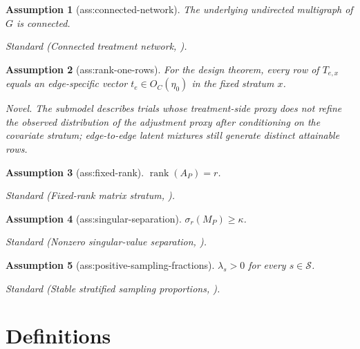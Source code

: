 \documentclass{article}
\newtheorem{assumption}{Assumption}
\begin{document}
\begin{assumption}[ass:connected-network]\label{ass:connected-network}
The underlying undirected multigraph of \(G\) is connected.
\par\smallskip\noindent\emph{Standard} (Connected treatment network, \cite{Rosa2018}).
\end{assumption}

\begin{assumption}[ass:rank-one-rows]\label{ass:rank-one-rows}
For the design theorem, every row of \(T_{e,x}\) equals an edge-specific vector \(t_e\in O_C(\eta_0)\) in the fixed stratum \(x\).
\par\smallskip\noindent\emph{Novel.} The submodel describes trials whose treatment-side proxy does not refine the observed distribution of the adjustment proxy after conditioning on the covariate stratum; edge-to-edge latent mixtures still generate distinct attainable rows.
\end{assumption}

\begin{assumption}[ass:fixed-rank]\label{ass:fixed-rank}
\(\operatorname{rank}(A_P)=r\).
\par\smallskip\noindent\emph{Standard} (Fixed-rank matrix stratum, \cite{StewartSun1990}).
\end{assumption}

\begin{assumption}[ass:singular-separation]\label{ass:singular-separation}
\(\sigma_r(M_P)\ge\kappa\).
\par\smallskip\noindent\emph{Standard} (Nonzero singular-value separation, \cite{StewartSun1990}).
\end{assumption}

\begin{assumption}[ass:positive-sampling-fractions]\label{ass:positive-sampling-fractions}
\(\lambda_s>0\) for every \(s\in\mathcal S\).
\par\smallskip\noindent\emph{Standard} (Stable stratified sampling proportions, \cite{vanDerVaart1998}).
\end{assumption}

\section{Definitions}
\end{document}
